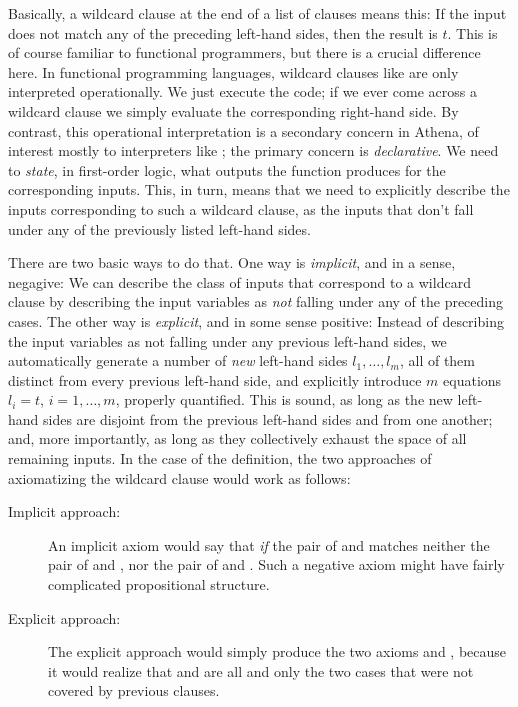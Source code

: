 Basically, a wildcard clause  at the end
of a  list of clauses means this: 
If the input does not match any of the preceding left-hand sides, 
then the result is $t$.  This is of course familiar to functional
programmers, but there is a crucial difference here. In functional programming languages, 
wildcard clauses like  are only interpreted
operationally. We just execute the code; if we ever come across a wildcard clause
we simply evaluate the corresponding right-hand side. By contrast, 
this operational interpretation is a secondary concern in Athena, of interest
mostly to interpreters like ; the primary 
concern is {\em declarative}. We need to {\em state}, in first-order logic, 
what outputs the function produces for the corresponding inputs. This, in
turn, means that we need to explicitly describe the inputs corresponding to
such a wildcard clause, as the inputs that don't fall under any of the
previously listed left-hand sides. 

There are two basic ways to do that. One way is {\em implicit}, and
in a sense, negagive: We can describe the class of inputs that correspond 
to a wildcard clause  by describing the input variables as 
{\em not\/} falling under any of the preceding cases. The other way
is {\em explicit}, and in some sense positive: Instead of describing the
input variables as not falling under any previous left-hand sides, 
we automatically generate a number of {\em new\/} left-hand sides $l_1,\ldots,l_m$, 
all of them distinct from every previous left-hand side, and explicitly 
introduce  $m$ equations $l_i = t$, $i = 1,\ldots, m$, properly quantified. 
This is sound, as long as the new left-hand sides are disjoint from
the previous left-hand sides and from one another; and, more importantly,
as long as they collectively exhaust the space of 
all remaining inputs. In the case of the  definition, the
two approaches of axiomatizing the wildcard clause would work as follows: 
\begin{description}
\item[Implicit approach:] An implicit axiom would say that 
 {\em if\/} the pair of  and  
matches neither the pair of  and , nor
the pair of  and . Such a negative axiom
might have fairly complicated propositional structure. 
\item[Explicit approach:] The explicit approach would simply produce
the two axioms
 and 
, because 
it would realize that  and
 are all and only the two
cases that were not covered by previous clauses.
\end{description}

